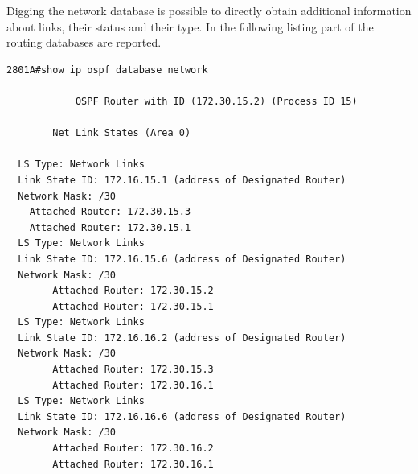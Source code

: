\documentclass{llncs}
\begin{document}
Digging the network database is possible to directly obtain additional information about links, their status and their type. In the following listing part of the routing databases are reported.
\\
\lstset{language=sh, caption=Router Cisco 2801A network database,  basicstyle=\ttfamily\scriptsize , breaklines=true}
\begin{lstlisting}
2801A#show ip ospf database network 

            OSPF Router with ID (172.30.15.2) (Process ID 15)

		Net Link States (Area 0)

  LS Type: Network Links
  Link State ID: 172.16.15.1 (address of Designated Router)
  Network Mask: /30
	Attached Router: 172.30.15.3
	Attached Router: 172.30.15.1
  LS Type: Network Links
  Link State ID: 172.16.15.6 (address of Designated Router)
  Network Mask: /30
        Attached Router: 172.30.15.2
        Attached Router: 172.30.15.1
  LS Type: Network Links
  Link State ID: 172.16.16.2 (address of Designated Router)
  Network Mask: /30
        Attached Router: 172.30.15.3
        Attached Router: 172.30.16.1
  LS Type: Network Links
  Link State ID: 172.16.16.6 (address of Designated Router)
  Network Mask: /30
        Attached Router: 172.30.16.2
        Attached Router: 172.30.16.1
\end{lstlisting}
\lstset{language=sh, caption=Router Cisco 2801A database router,  basicstyle=\ttfamily\scriptsize , breaklines=true}
\end{document}
